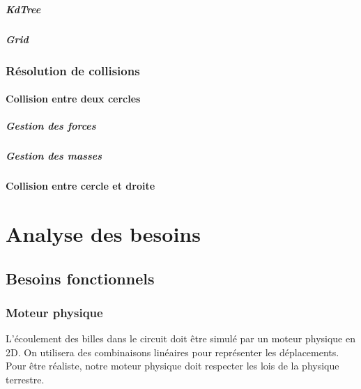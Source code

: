\documentclass{report}
\begin{document}
\paragraph{KdTree}

\paragraph{Grid}

\subsection{Résolution de collisions}

\subsubsection{Collision entre deux cercles}

\paragraph{Gestion des forces}

\paragraph{Gestion des masses}

\subsubsection{Collision entre cercle et droite}

\chapter{Analyse des besoins}

\section{Besoins fonctionnels}

\subsection{Moteur physique}

L’écoulement des billes dans le circuit doit être simulé par un moteur physique en 2D. On utilisera des combinaisons linéaires pour représenter les déplacements. Pour être réaliste, notre moteur physique doit respecter les lois de la physique terrestre. \\
\end{document}
